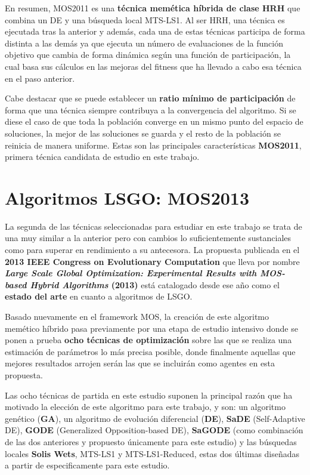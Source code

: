 En resumen, MOS2011 es una \textbf{técnica memética híbrida de clase HRH} que combina un DE y una búsqueda local MTS-LS1. Al ser HRH, una técnica es ejecutada tras la anterior y además, cada una de estas técnicas participa de forma distinta a las demás ya que ejecuta un número de evaluaciones de la función objetivo que cambia de forma dinámica según una función de participación, la cual basa sus cálculos en las mejoras del fitness que ha llevado a cabo esa técnica en el paso anterior. 

Cabe destacar que se puede establecer un \textbf{ratio mínimo de participación} de forma que una técnica siempre contribuya a la convergencia del algoritmo. Si se diese el caso de que toda la población converge en un mismo punto del espacio de soluciones, la mejor de las soluciones se guarda y el resto de la población se reinicia de manera uniforme. Estas son las principales características \textbf{MOS2011}, primera técnica candidata de estudio en este trabajo.

\section{Algoritmos LSGO: MOS2013}

La segunda de las técnicas seleccionadas para estudiar en este trabajo se trata de una muy similar a la anterior pero con cambios lo suficientemente sustanciales como para superar en rendimiento a su antecesora. La propuesta publicada en el \textbf{2013 IEEE Congress on Evolutionary Computation} que lleva por nombre \textbf{\textit{Large Scale Global Optimization: Experimental Results with MOS-based Hybrid Algorithms} (2013)}\cite{MOS2013} está catalogado desde ese año como el \textbf{estado del arte} en cuanto a algoritmos de LSGO.

Basado nuevamente en el framework MOS, la creación de este algoritmo memético híbrido pasa previamente por una etapa de estudio intensivo donde se ponen a prueba \textbf{ocho técnicas de optimización} sobre las que se realiza una estimación de parámetros lo más precisa posible, donde finalmente aquellas que mejores resultados arrojen serán las que se incluirán como agentes en esta propuesta.

Las ocho técnicas de partida en este estudio suponen la principal razón que ha motivado la elección de este algoritmo para este trabajo, y son: un algoritmo genético (\textbf{GA}), un algoritmo de evolución diferencial (\textbf{DE}\cite{DE}), \textbf{SaDE}\cite{SaDE} (Self-Adaptive DE), \textbf{GODE}\cite{GODE} (Generalized Opposition-based DE), \textbf{SaGODE} (como combinación de las dos anteriores y propuesto únicamente para este estudio) y las búsquedas locales \textbf{Solis Wets}\cite{SolisWets}, MTS-LS1 y MTS-LS1-Reduced, estas dos últimas diseñadas a partir de \cite{MTS-LSGO} especificamente para este estudio. 

